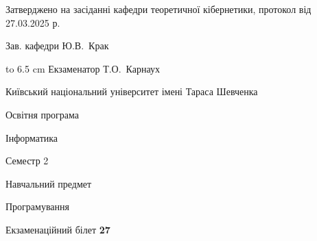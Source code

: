 \documentclass[12pt, ukrainian]{article}
\begin{document}
{\smallskip\smallskip \begin {scriptsize} Затверджено на засіданні кафедри теоретичної кібернетики, протокол   від   27.03.2025 р.\par\smallskip\smallskip\smallskip\smallskip
{\parbox {6.5 cm} {Зав. кафедри \dotfill Ю.В.~Крак}}\hspace {0.7cm} {\hbox to 6.5 cm { Екзаменатор \dotfill Т.О.~Карнаух}} \end{scriptsize}}
\newpage
{{\begin {scriptsize}\par
{ \center  Київський національний університет імені Тараса Шевченка \par}
{\parbox {5 cm}{Освітня програма \hfill}{\parbox {7 cm}{Інформатика\hfill}}\parbox {6 cm}{\hfill Семестр 2}}\par
{\parbox {5 cm} {Навчальний предмет \hfill}\parbox {7 cm}{Програмування \hfill}\parbox {6cm}{\hfill}\par}\vspace{-15pt} \end{scriptsize}}{\center Екзаменаційний білет \No \textbf { 27 }\par}}
\end{document}
